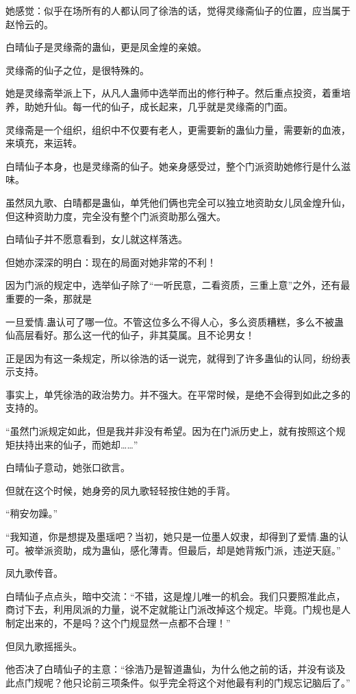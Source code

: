 \begin{this_body}
她感觉：似乎在场所有的人都认同了徐浩的话，觉得灵缘斋仙子的位置，应当属于赵怜云的。

白晴仙子是灵缘斋的蛊仙，更是凤金煌的亲娘。

灵缘斋的仙子之位，是很特殊的。

她是灵缘斋举派上下，从凡人蛊师中选举而出的修行种子。然后重点投资，着重培养，助她升仙。每一代的仙子，成长起来，几乎就是灵缘斋的门面。

灵缘斋是一个组织，组织中不仅要有老人，更需要新的蛊仙力量，需要新的血液，来填充，来运转。

白晴仙子本身，也是灵缘斋的仙子。她亲身感受过，整个门派资助她修行是什么滋味。

虽然凤九歌、白晴都是蛊仙，单凭他们俩也完全可以独立地资助女儿凤金煌升仙，但这种资助力度，完全没有整个门派资助那么强大。

白晴仙子并不愿意看到，女儿就这样落选。

但她亦深深的明白：现在的局面对她非常的不利！

因为门派的规定中，选举仙子除了“一听民意，二看资质，三重上意”之外，还有最重要的一条，那就是

一旦爱情.蛊认可了哪一位。不管这位多么不得人心，多么资质糟糕，多么不被蛊仙高层看好。那么这一代的仙子，非其莫属。且不论男女！

正是因为有这一条规定，所以徐浩的话一说完，就得到了许多蛊仙的认同，纷纷表示支持。

事实上，单凭徐浩的政治势力。并不强大。在平常时候，是绝不会得到如此之多的支持的。

“虽然门派规定如此，但是我并非没有希望。因为在门派历史上，就有按照这个规矩扶持出来的仙子，而她却……”

白晴仙子意动，她张口欲言。

但就在这个时候，她身旁的凤九歌轻轻按住她的手背。

“稍安勿躁。”

“我知道，你是想提及墨瑶吧？当初，她只是一位墨人奴隶，却得到了爱情.蛊的认可。被举派资助，成为蛊仙，感化薄青。但最后，却是她背叛门派，违逆天庭。”

凤九歌传音。

白晴仙子点点头，暗中交流：“不错，这是煌儿唯一的机会。我们只要照准此点，商讨下去，利用凤派的力量，说不定就能让门派改掉这个规定。毕竟。门规也是人制定出来的，不是吗？这个门规显然一点都不合理！”

但凤九歌摇摇头。

他否决了白晴仙子的主意：“徐浩乃是智道蛊仙，为什么他之前的话，并没有谈及此点门规呢？他只论前三项条件。似乎完全将这个对他最有利的门规忘记脑后了。”


\end{this_body}
